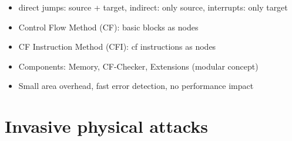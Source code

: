 \documentclass[11pt, paper=a4, twocolumn]{scrartcl}
\begin{document}
\begin{itemize}
\begin{itemize}
\begin{itemize}
							\item direct jumps: source + target, indirect: only source, interrupts: only target
							\item Control Flow Method (CF): basic blocks as nodes
							\item CF Instruction Method (CFI): cf instructions as nodes
							\item Components: Memory, CF-Checker, Extensions (modular concept)
							\item Small area overhead, fast error detection, no performance impact
						\end{itemize}
				\end{itemize}

		\end{itemize}

	\section{Invasive physical attacks}
\end{document}

